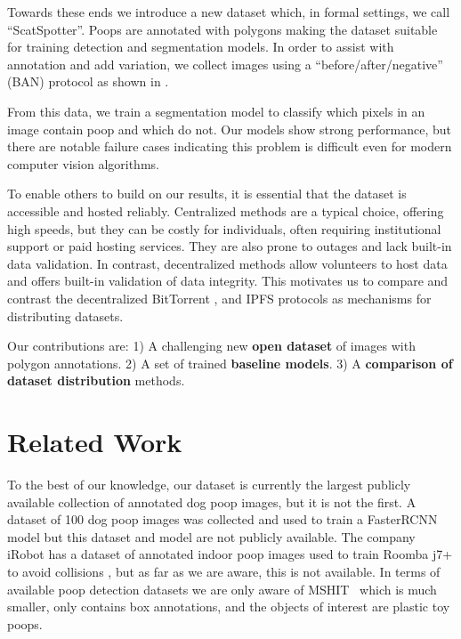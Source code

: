 \documentclass{article}
\begin{document}
Towards these ends we introduce a new dataset which, 
in formal settings, we call ``ScatSpotter''.
Poops are annotated with polygons making the dataset suitable for training detection and segmentation
  models.
In order to assist with annotation and add variation, we collect images using a ``before/after/negative'' (BAN)
  protocol as shown in .

From this data, we train a segmentation model to classify which pixels in an image contain poop and which do
  not.
Our models show strong performance, but there are notable failure cases indicating this problem is difficult
  even for modern computer vision algorithms. 

To enable others to build on our results, it is essential that the dataset is accessible and hosted
  reliably.
Centralized methods are a typical choice, offering high speeds, but they can be costly for individuals,
  often requiring institutional support or paid hosting services.
They are also prone to outages and lack built-in data validation.
In contrast, decentralized methods allow volunteers to host data and offers built-in validation of data
  integrity.
This motivates us to compare and contrast the decentralized BitTorrent \cite{cohen_incentives_2003}, and
  IPFS \cite{benet_ipfs_2014} protocols as mechanisms for distributing datasets.


Our contributions are:
1) A challenging new \textbf{open dataset} of images with polygon annotations.
2) A set of trained \textbf{baseline models}.
3) A \textbf{comparison of dataset distribution} methods.


\section{Related Work}
\label{sec:relatedwork}

To the best of our knowledge, our dataset is currently the largest publicly available collection of
  annotated dog poop images, but it is not the first.
A dataset of 100 dog poop images was collected and used to train a FasterRCNN model
  \cite{neeraj_madan_dog_2019} but this dataset and model are not publicly available.
The company iRobot has a dataset of annotated indoor poop images used to train Roomba j7+ to avoid
  collisions \cite{roomba_2021}, but as far as we are aware, this is not available.
In terms of available poop detection datasets we are only aware of MSHIT~\cite{mshit_2020} which is much
  smaller, only contains box annotations, and the objects of interest are plastic toy poops.
\end{document}

